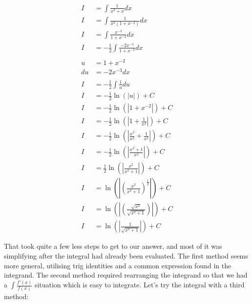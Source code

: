 \documentclass[12pt]{article}
\begin{document}
\begin{align}
    I  & = \int \frac{1}{x^3+x} dx                                                       \\
    I  & = \int \frac{1}{x^3(1+x^{-2})} dx                                               \\
    I  & = \int \frac{x^{-3}}{1+x^{-2}} dx                                               \\
    I  & = -\frac{1}{2} \int \frac{-2x^{-3}}{1+x^{-2}} dx                                \\
    \nonumber                                                                            \\
    u  & = 1+x^{-2}                                                                      \\
    du & = -2x^{-3} dx                                                                   \\
    \nonumber                                                                            \\
    I  & = -\frac{1}{2} \int \frac{1}{u} du                                              \\
    I  & = -\frac{1}{2} \ln(|u|) + C                                                     \\
    I  & = -\frac{1}{2} \ln(|1+x^{-2}|) + C                                              \\
    I  & = -\frac{1}{2} \ln\left(\left|1+\frac{1}{x^2}\right|\right) + C                 \\
    I  & = -\frac{1}{2} \ln\left(\left|\frac{x^2}{x^2}+\frac{1}{x^2}\right|\right) + C   \\
    I  & = -\frac{1}{2} \ln\left(\left|\frac{x^2+1}{x^2}\right|\right) + C               \\
    I  & = \frac{1}{2} \ln\left(\left|\frac{x^2}{x^2+1}\right|\right) + C                \\
    I  & = \ln\left(\left|\left(\frac{x^2}{x^2+1}\right)^{\frac{1}{2}}\right|\right) + C \\
    I  & = \ln\left(\left|\left(\frac{\sqrt{x^2}}{\sqrt{x^2+1}}\right)\right|\right) + C \\
    I  & = \ln\left(\left|\frac{1}{\sqrt{x^2+1}}\right|\right) + C
\end{align}


That took quite a few less steps to get to our answer, and most of it was simplifying after the integral had already been evaluated.
The first method seems more general, utilising trig identities and a common expression found in the integrand.
The second method required rearranging the integrand so that we had a $\int \frac{f'(x)}{f(x)}$ situation which is easy to integrate.
Let's try the integral with a third method:
\end{document}
